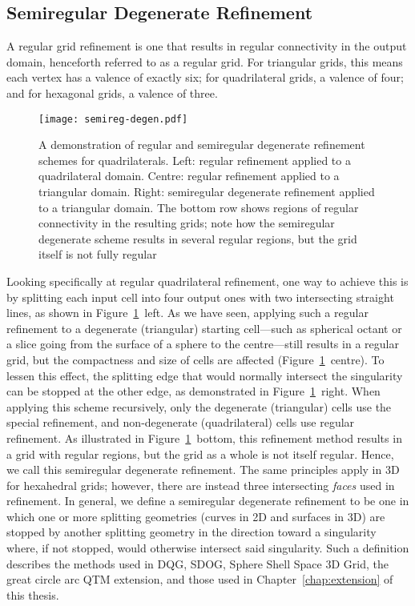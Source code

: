 \subsection{Semiregular Degenerate Refinement} \label{chap:3:semiregDegen}
A regular grid refinement is one that results in regular connectivity in the output domain, henceforth referred to as a regular grid.
For triangular grids, this means each vertex has a valence of exactly six; for quadrilateral grids, a valence of four; and for hexagonal grids, a valence of three.


\begin{figure}[ht!]
	\centering
	\texttt{[image: semireg-degen.pdf]}
	\caption[Comparison of regular and semiregular degenerate refinement]{
		A demonstration of regular and semiregular degenerate refinement schemes for quadrilaterals.
		Left: regular refinement applied to a quadrilateral domain.
		Centre: regular refinement applied to a triangular domain.
		Right: semiregular degenerate refinement applied to a triangular domain.
		The bottom row shows regions of regular connectivity in the resulting grids; note how the semiregular degenerate scheme results in several regular regions, but the grid itself is not fully regular
	}
	\label{fig:semireg-degen}
\end{figure}


Looking specifically at regular quadrilateral refinement, one way to achieve this is by splitting each input cell into four output ones with two intersecting straight lines, as shown in Figure~\ref{fig:semireg-degen}~left.
As we have seen, applying such a regular refinement to a degenerate (triangular) starting cell---such as spherical octant or a slice going from the surface of a sphere to the centre---still results in a regular grid, but the compactness and size of cells are affected (Figure~\ref{fig:semireg-degen}~centre).
To lessen this effect, the splitting edge that would normally intersect the singularity can be stopped at the other edge, as demonstrated in Figure~\ref{fig:semireg-degen}~right.
When applying this scheme recursively, only the degenerate (triangular) cells use the special refinement, and non-degenerate (quadrilateral) cells use regular refinement.
As illustrated in Figure~\ref{fig:semireg-degen}~bottom, this refinement method results in a grid with regular regions, but the grid as a whole is not itself regular.
Hence, we call this semiregular degenerate refinement.
The same principles apply in 3D for hexahedral grids; however, there are instead three intersecting \textit{faces} used in refinement.
In general, we define a semiregular degenerate refinement to be one in which one or more splitting geometries (curves in 2D and surfaces in 3D) are stopped by another splitting geometry in the direction toward a singularity where, if not stopped, would otherwise intersect said singularity.
Such a definition describes the methods used in DQG, SDOG, Sphere Shell Space 3D Grid, the great circle arc QTM extension, and those used in Chapter~\ref{chap:extension} of this thesis.


